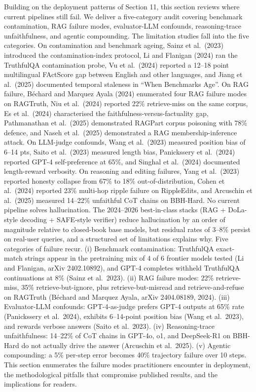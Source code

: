 Building on the deployment patterns of Section 11, this section reviews where current pipelines still fail. We deliver a five-category audit covering benchmark contamination, RAG failure modes, evaluator-LLM confounds, reasoning-trace unfaithfulness, and agentic compounding. The limitation studies fall into the five categories. On contamination and benchmark ageing, Sainz et al.~(2023) introduced the contamination-index protocol, Li and Flanigan (2024) ran the TruthfulQA contamination probe, Vu et al.~(2024) reported a 12--18 point multilingual FActScore gap between English and other languages, and Jiang et al.~(2025) documented temporal staleness in ``When Benchmarks Age''. On RAG failure, Béchard and Marquez Ayala (2024) enumerated four RAG failure modes on RAGTruth, Niu et al.~(2024) reported 22\% retrieve-miss on the same corpus, Es et al.~(2024) characterised the faithfulness-versus-factuality gap, Pathmanathan et al.~(2025) demonstrated RAGPart corpus poisoning with 78\% defence, and Naseh et al.~(2025) demonstrated a RAG membership-inference attack. On LLM-judge confounds, Wang et al.~(2023) measured position bias of 6--14 pts, Saito et al.~(2023) measured length bias, Panickssery et al.~(2024) reported GPT-4 self-preference at 65\%, and Singhal et al.~(2024) documented length-reward verbosity. On reasoning and editing failures, Yang et al.~(2023) reported honesty collapse from 67\% to 18\% out-of-distribution, Cohen et al.~(2024) reported 23\% multi-hop ripple failure on RippleEdits, and Arcuschin et al.~(2025) measured 14--22\% unfaithful CoT chains on BBH-Hard. No current pipeline solves hallucination. The 2024--2026 best-in-class stacks (RAG + DoLa-style decoding + SAFE-style verifier) reduce hallucination by an order of magnitude relative to closed-book base models, but residual rates of 3--8\% persist on real-user queries, and a structured set of limitations explains why. Five categories of failure recur. (i) Benchmark contamination: TruthfulQA exact-match strings appear in the pretraining mix of 4 of 6 frontier models tested (Li and Flanigan, arXiv 2402.10892), and GPT-4 completes withheld TruthfulQA continuations at 8\% (Sainz et al.~2023). (ii) RAG failure modes: 22\% retrieve-miss, 35\% retrieve-but-ignore, plus retrieve-but-misread and retrieve-and-refuse on RAGTruth (Béchard and Marquez Ayala, arXiv 2404.08189, 2024). (iii) Evaluator-LLM confounds: GPT-4-as-judge prefers GPT-4 outputs at 65\% rate (Panickssery et al.~2024), exhibits 6--14-point position bias (Wang et al.~2023), and rewards verbose answers (Saito et al.~2023). (iv) Reasoning-trace unfaithfulness: 14--22\% of CoT chains in GPT-4o, o1, and DeepSeek-R1 on BBH-Hard do not actually drive the answer (Arcuschin et al.~2025). (v) Agentic compounding: a 5\% per-step error becomes 40\% trajectory failure over 10 steps. This section enumerates the failure modes practitioners encounter in deployment, the methodological pitfalls that compromise published results, and the implications for readers.


